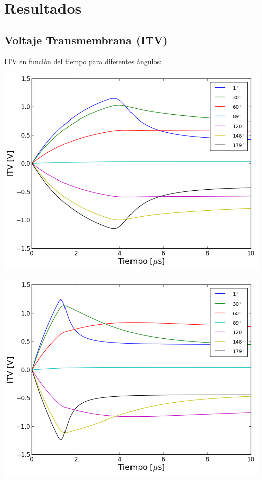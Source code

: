 \documentclass[a0,portrait]{a0poster}
\begin{document}
\begin{multicols}{2}
\begin{multicols}{2}
\end{multicols}

\section*{Resultados}

\subsection*{Voltaje Transmembrana (ITV)}
ITV en función del tiempo para diferentes ángulos:

	\begin{multicols}{2}
		\begin{center}\vspace{1cm}
			\includegraphics[width=1\linewidth]{itv-time-lin-25-64-40KVm}
		\end{center}\vspace{1cm}
	\columnbreak
		\begin{center}\vspace{1cm}
			\includegraphics[width=1\linewidth]{itv-time-lin-25-64-80KVm}

\end{center}
\end{multicols}
\end{multicols}
\end{document}
